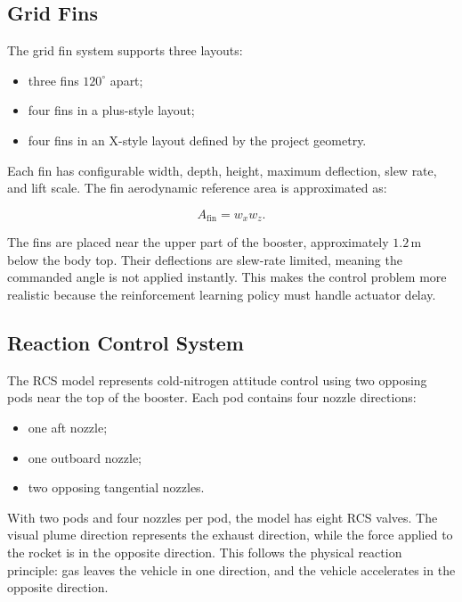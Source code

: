 \documentclass[12pt,a4paper]{article}
\begin{document}
\subsection{Grid Fins}

The grid fin system supports three layouts:

\begin{itemize}
    \item three fins \(120^\circ\) apart;
    \item four fins in a plus-style layout;
    \item four fins in an X-style layout defined by the project geometry.
\end{itemize}

Each fin has configurable width, depth, height, maximum deflection, slew rate, and lift scale. The fin aerodynamic reference area is approximated as:

\begin{equation}
A_{\mathrm{fin}} = w_x w_z.
\end{equation}

The fins are placed near the upper part of the booster, approximately \(1.2\,\mathrm{m}\) below the body top. Their deflections are slew-rate limited, meaning the commanded angle is not applied instantly. This makes the control problem more realistic because the reinforcement learning policy must handle actuator delay.

\subsection{Reaction Control System}

The RCS model represents cold-nitrogen attitude control using two opposing pods near the top of the booster. Each pod contains four nozzle directions:

\begin{itemize}
    \item one aft nozzle;
    \item one outboard nozzle;
    \item two opposing tangential nozzles.
\end{itemize}

With two pods and four nozzles per pod, the model has eight RCS valves. The visual plume direction represents the exhaust direction, while the force applied to the rocket is in the opposite direction. This follows the physical reaction principle: gas leaves the vehicle in one direction, and the vehicle accelerates in the opposite direction.
\end{document}
